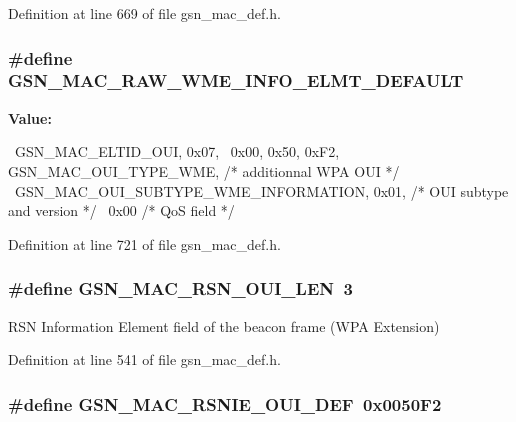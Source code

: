 Definition at line 669 of file gsn\_\-mac\_\-def.h.

\hypertarget{a00522_aa39e92a660fb9f64e3407182f200e491}{
\subsubsection[{GSN\_\-MAC\_\-RAW\_\-WME\_\-INFO\_\-ELMT\_\-DEFAULT}]{\setlength{\rightskip}{0pt plus 5cm}\#define GSN\_\-MAC\_\-RAW\_\-WME\_\-INFO\_\-ELMT\_\-DEFAULT}}
\label{a00522_aa39e92a660fb9f64e3407182f200e491}
{\bfseries Value:}
\begin{DoxyCode}
{{                                                                               
              \
    GSN_MAC_ELTID_OUI, 0x07,                                                     
                  \
    0x00, 0x50, 0xF2, GSN_MAC_OUI_TYPE_WME,         /* additionnal WPA OUI       
               */ \
    GSN_MAC_OUI_SUBTYPE_WME_INFORMATION, 0x01,      /* OUI subtype and version   
               */ \
    0x00                                        /* QoS field                     
           */ \
}}
\end{DoxyCode}


Definition at line 721 of file gsn\_\-mac\_\-def.h.

\hypertarget{a00522_a8b43b8bccd505160fcc2ce3404b04c57}{
\subsubsection[{GSN\_\-MAC\_\-RSN\_\-OUI\_\-LEN}]{\setlength{\rightskip}{0pt plus 5cm}\#define GSN\_\-MAC\_\-RSN\_\-OUI\_\-LEN~3}}
\label{a00522_a8b43b8bccd505160fcc2ce3404b04c57}


RSN Information Element field of the beacon frame (WPA Extension) 



Definition at line 541 of file gsn\_\-mac\_\-def.h.

\hypertarget{a00522_aee7bb76b19849f47fa6440e5faf9b64f}{
\subsubsection[{GSN\_\-MAC\_\-RSNIE\_\-OUI\_\-DEF}]{\setlength{\rightskip}{0pt plus 5cm}\#define GSN\_\-MAC\_\-RSNIE\_\-OUI\_\-DEF~0x0050F2}}
\label{a00522_aee7bb76b19849f47fa6440e5faf9b64f}


